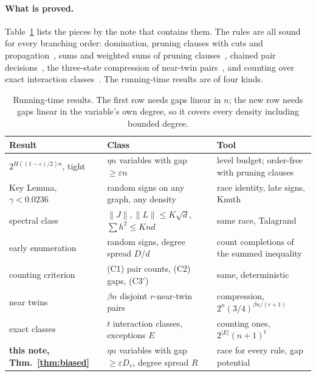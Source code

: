 \documentclass[11pt,a4paper]{article}
\theoremstyle{definition}
\theoremstyle{remark}
\begin{document}
\paragraph{What is proved.} Table~\ref{tab:status} lists the pieces by the
note that contains them. The rules are all sound for every branching order:
domination, pruning clauses with cuts and propagation~\cite{N3}, sums and
weighted sums of pruning clauses~\cite{N4}, chained pair decisions~\cite{N4},
the three-state compression of near-twin pairs~\cite{NT}, and counting over
exact interaction classes~\cite{N5}. The running-time results are of four
kinds.

\begin{table}[ht]
\centering\small
\begin{tabular}{@{}p{}p{}p{}@{}}
\toprule
Result & Class & Tool \\
\midrule
$2^{H((1-\varepsilon)/2)n}$, tight~\cite{N2,N3} & $\eta n$ variables with gap $\ge\varepsilon n$ & level budget; order-free with pruning clauses\\
Key Lemma, $\gamma<0.0236$~\cite{N7,N8} & random signs on any graph, any density & race identity, late signs, Knuth\\
spectral class~\cite{N9} & $\|J\|,\|L\|\le K\sqrt d$, $\sum h^2\le Knd$ & same race, Talagrand \\
early enumeration~\cite{EE} & random signs, degree spread $D/d$ & count completions of the summed inequality\\
counting criterion~\cite{CC,CA} & (C1) pair counts, (C2) gaps, (C3$'$) & same, deterministic\\
near twins~\cite{NT} & $\beta n$ disjoint $r$-near-twin pairs & compression, $2^n(3/4)^{\beta n/(r+1)}$\\
exact classes~\cite{N5} & $t$ interaction classes, exceptions $E$ & counting ones, $2^{|E|}(n+1)^t$\\
\textbf{this note, Thm.~\ref{thm:biased}} & $\eta n$ variables with gap $\ge\varepsilon D_v$, degree spread $R$ & race for every rule, gap potential\\
\bottomrule
\end{tabular}
\caption{Running-time results. The first row needs gaps linear in $n$; the
new row needs gaps linear in the variable's own degree, so it covers every
density including bounded degree.}\label{tab:status}
\end{table}
\end{document}
